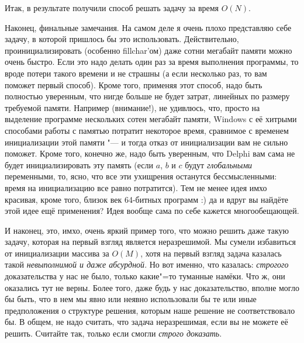 Итак, в результате получили способ решать задачу за время $O(N)$.

Наконец, финальные замечания. На самом деле я очень плохо представляю себе задачу, в которой 
пришлось бы это использовать. Действительно, проинициализировать (особенно fillchar'ом) даже сотни 
мегабайт памяти можно очень быстро. Если это надо делать один раз за время выполнения программы, то 
вроде потери такого времени и не страшны (а если несколько раз, то вам поможет первый способ). 
Кроме того, применяя этот способ, надо 
быть полностью уверенным, что нигде больше не будет затрат, линейных по размеру требуемой памяти. 
Например (внимание!), не удивлюсь, что, просто на выделение программе нескольких сотен мегабайт 
памяти, Windows с её хитрыми способами работы с памятью потратит некоторое время, сравнимое с
временем инициализации этой памяти "--- и тогда отказ от инициализации вам не сильно поможет.
Кроме того, конечно же, надо быть уверенным, что Delphi вам сама не будет инициализировать эту
память (если $a$, $b$ и $c$ будут \textit{глобальными} переменными, то, ясно, что все эти ухищрения
останутся бессмысленными: время на инициализацию все равно потратится). Тем не менее идея имхо 
красивая, кроме того, близок век 64-битных 
программ :) да и вдруг вы найдёте этой идее ещё применения? Идея вообще сама по себе кажется 
многообещающей.

И наконец, это, имхо, очень яркий пример того, что можно решить даже такую задачу, которая на 
первый взгляд является неразрешимой. Мы сумели избавиться от инициализации массива за $O(M)$, хотя 
на первый взгляд задача казалась такой \textit{невыполнимой и даже абсурдной}. Но вот именно, что 
казалась: \textit{строгого} доказательства у нас не было, только какие"=то туманные намёки. Что ж, 
они оказались тут не верны. Более того, даже будь у нас доказательство, вполне могло бы быть, что в 
нем мы явно или неявно использовали бы те или иные предположения о структуре решения, которым наше 
решение не соответствовало бы. В общем, не надо считать, что задача неразрешимая, если вы не можете 
её решить. Считайте так, только если смогли \textit{строго доказать}.
